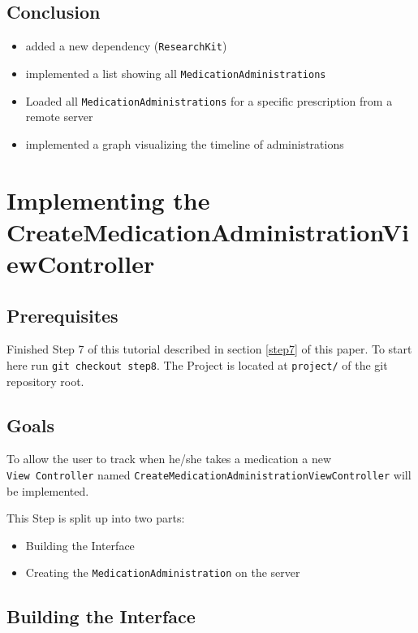 \documentclass{article}
\begin{document}
\subsection{Conclusion}\label{step7:conclusion}

\begin{itemize}
  \item
    added a new dependency (\texttt{ResearchKit})
  \item
    implemented a list showing all \texttt{MedicationAdministrations}
  \item
    Loaded all \texttt{MedicationAdministrations} for a specific prescription from a remote server
  \item
    implemented a graph visualizing the timeline of administrations
\end{itemize}

\section{Implementing the CreateMedicationAdministrationViewController}\label{step8}

\subsection{Prerequisites}\label{step8:prerequisites}
Finished Step 7 of this tutorial described in section \ref{step7} of this paper.
To start here run \texttt{git checkout step8}.
The Project is located at \texttt{project/} of the git repository root.

\subsection{Goals}\label{step8:goals}

To allow the user to track when he/she takes a medication a new
\texttt{View\ Controller} named
\texttt{CreateMedicationAdministrationViewController} will be
implemented.

This Step is split up into two parts:
\begin{itemize}
  \item
    Building the Interface
  \item
    Creating the \texttt{MedicationAdministration} on the server
\end{itemize}

\subsection{Building the Interface}\label{step-8.1---implementing-createmedicationadministrationviewcontroller---building-the-interface}
\end{document}
